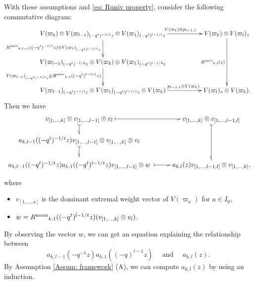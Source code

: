 \documentclass[11pt, leqno]{amsart}
\theoremstyle{definition}
\numberwithin{equation}{section}
\begin{document}
With these assumptions and \eqref{eq: Runiv property}, consider the following commutative diagram:
\begin{align} \label{Diagram: Runiv}
    \xymatrix@R=6.5ex{
    V(\varpi_k) \otimes V(\varpi_{l-1})_{(-q^t)^{-1/t}z} \otimes V(\varpi_{1})_{(-q^t)^{l-1/t}z}
    \ar[rr]^{\qquad \qquad \quad V(\varpi_k)\otimes p_{l-1,1}} \ar[d]_{{R^{\rm{univ}}}_{k,l-1}((-q^t)^{-1/t}z) \otimes V(\varpi_{1})_{(-q^t)^{l-1/t}z}} &&
    V(\varpi_{k}) \otimes V(\varpi_{l})_{z} \ar[dd]_{{R^{\rm{univ}}}_{k,l}(z)} \\
    V(\varpi_{l-1})_{(-q^t)^{-1/2}z}  \otimes V(\varpi_{k}) \otimes V(\varpi_{1})_{(-q^t)^{l-1/2}z}
    \ar[d]_{V(\varpi_{l-1})_{(-q^t)^{-1/t}z} \otimes {R^{\rm{univ}}}_{k,1}((-q^t)^{l-1/t}z)} &\\
    V(\varpi_{l-1})_{(-q^t)^{-1/t}z} \otimes V(\varpi_{1})_{(-q^t)^{l-1/t}z}  \otimes V(\varpi_{k})\ar[rr]^{\qquad \qquad \qquad p_{l-1,1}\otimes V(\varpi_k) } &&
    V(\varpi_{l})_{z} \otimes V(\varpi_{k}).
    }
\end{align}
Then we have
\begin{align}\label{Diagram: Runiv2}
   \xymatrix@R=3.5ex{
    v_{[1,\ldots,k]} \otimes v_{[1,\ldots, l-1]} \otimes v_{l}
    \ar@{|-_{>}}[r] \ar@{|-_{>}}[d] &
    v_{[1,\ldots,k]} \otimes v_{[1,\ldots, l-1,l]} \ar@{|-_{>}}[dd]\\
    a_{k,l-1}((-q^t)^{-1/t}z) v_{[1,\ldots, l-1]} \otimes v_{[1,\ldots,k]} \otimes v_{l}
    \ar@{|-_{>}}[d] &\\
*++{a_{k,l-1}((-q^t)^{-1/t}z) a_{k,1}((-q^t)^{l-1/t}z)
         v_{[1,\ldots, l-1]} \otimes w} \ar@{|-_{>}}[r] &
   a_{k,l}(z) v_{[1,\ldots, l-1,l]} \otimes v_{[1,\ldots,k]},
    }
\end{align}
where \begin{itemize}
\item $v_{[1,\ldots, a]}$ is the dominant extremal weight vector of $V({\varpi}_{a})$ for $a \in I_0$,
\item $w={R^{\rm{norm}}}_{k,1}((-q^t)^{l-1/t}z)( v_{[1,\dots,k]} \otimes v_l)$.
\end{itemize}
By observing the vector $w$, we can get an equation explaining the relationship between
$$a_{k,l-1}(-q^{-1}z) a_{k,1}((-q)^{l-1}z) \quad \text{ and } \quad a_{k,l}(z).$$
By Assumption \ref{Assum: framework} (A), we can compute $a_{k,l}(z)$ by using an induction.
\end{document}
